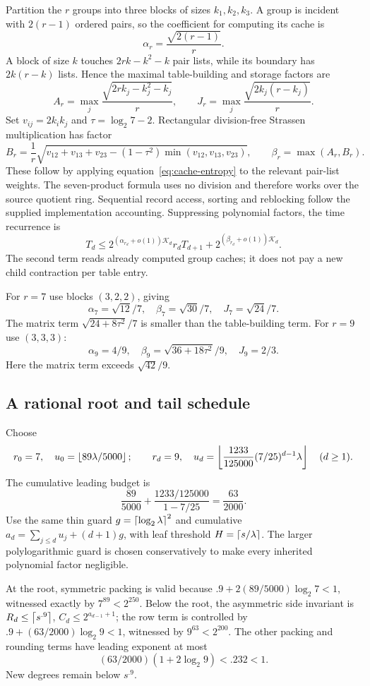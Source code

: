 Partition the $r$ groups into three blocks of sizes $k_1,k_2,k_3$. A group is incident with $2(r-1)$ ordered pairs, so the coefficient for computing its cache is
\[
 \alpha_r=\frac{\sqrt{2(r-1)}}r.
\]
A block of size $k$ touches $2rk-k^2-k$ pair lists, while its boundary has $2k(r-k)$ lists. Hence the maximal table-building and storage factors are
\[
 A_r=\max_j\frac{\sqrt{2rk_j-k_j^2-k_j}}r,
 \qquad J_r=\max_j\frac{\sqrt{2k_j(r-k_j)}}r.
\]
Set $v_{ij}=2k_ik_j$ and $\tau=\log_2 7-2$. Rectangular division-free Strassen multiplication has factor
\[
 B_r=\frac1r\sqrt{v_{12}+v_{13}+v_{23}
 -(1-\tau^2)\min(v_{12},v_{13},v_{23})},
 \qquad\beta_r=\max(A_r,B_r).
\]
These follow by applying equation~\eqref{eq:cache-entropy} to the relevant pair-list weights. The seven-product formula uses no division and therefore works over the source quotient ring. Sequential record access, sorting and reblocking follow the supplied implementation accounting. Suppressing polynomial factors, the time recurrence is
\begin{equation}\label{eq:cache-rec}
 T_d\le2^{(\alpha_{r_d}+o(1))\mathcal K_d}r_dT_{d+1}
       +2^{(\beta_{r_d}+o(1))\mathcal K_d}.
\end{equation}
The second term reads already computed group caches; it does not pay a new child contraction per table entry.

For $r=7$ use blocks $(3,2,2)$, giving
\[
 \alpha_7=\sqrt{12}/7,\quad\beta_7=\sqrt{30}/7,
 \quad J_7=\sqrt{24}/7.
\]
The matrix term $\sqrt{24+8\tau^2}/7$ is smaller than the table-building term. For $r=9$ use $(3,3,3)$:
\[
 \alpha_9=4/9,\quad\beta_9=\sqrt{36+18\tau^2}/9,
 \quad J_9=2/3.
\]
Here the matrix term exceeds $\sqrt{42}/9$.

\subsection{A rational root and tail schedule}
Choose
\[
 r_0=7,\quad u_0=\left\lfloor89\lambda/5000\right\rfloor;\qquad
 r_d=9,\quad u_d=\left\lfloor\frac{1233}{125000}
 (7/25)^{d-1}\lambda\right\rfloor\quad(d\ge1).
\]
The cumulative leading budget is
\[
 \frac{89}{5000}+\frac{1233/125000}{1-7/25}=\frac{63}{2000}.
\]
Use the same thin guard $g=\left\lceil\log_2\lambda\right\rceil^2$ and cumulative $a_d=\sum_{j\le d}u_j+(d+1)g$, with leaf threshold $H=\left\lceil s/\lambda\right\rceil$. The larger polylogarithmic guard is chosen conservatively to make every inherited polynomial factor negligible.

At the root, symmetric packing is valid because
$.9+2(89/5000)\log_2 7<1$, witnessed exactly by $7^{89}<2^{250}$. Below the root, the asymmetric side invariant is $R_d\le\left\lceil s^{.9}\right\rceil$, $C_d\le2^{a_{d-1}+1}$; the row term is controlled by
$.9+(63/2000)\log_2 9<1$, witnessed by $9^{63}<2^{200}$. The other packing and rounding terms have leading exponent at most
\[
 (63/2000)(1+2\log_2 9)<.232<1.
\]
New degrees remain below $s^{.9}$.

